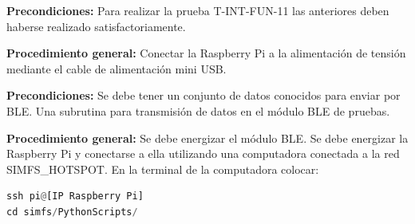%
%
%

\label{sec:BancoDePruebas}
%


\label{sec:PlanValidacion}


\textbf{Precondiciones:}
Para realizar la prueba T-INT-FUN-11 las anteriores deben haberse realizado satisfactoriamente.

\textbf{Procedimiento general:}
Conectar la Raspberry Pi a la alimentación de tensión mediante el cable de alimentación mini USB.





\textbf{Precondiciones:} Se debe tener un conjunto de datos conocidos para enviar por BLE. Una subrutina para transmisión de datos en el módulo BLE de pruebas.

\textbf{Procedimiento general:} Se debe energizar el módulo BLE. Se debe energizar la Raspberry Pi y conectarse a ella utilizando una computadora conectada a la red
SIMFS\_HOTSPOT. En la terminal de la computadora colocar:
\begin{lstlisting}[language=Python]
ssh pi@[IP Raspberry Pi] 
cd simfs/PythonScripts/
\end{lstlisting}





\label{sec:MatrizTrazabilidad}


